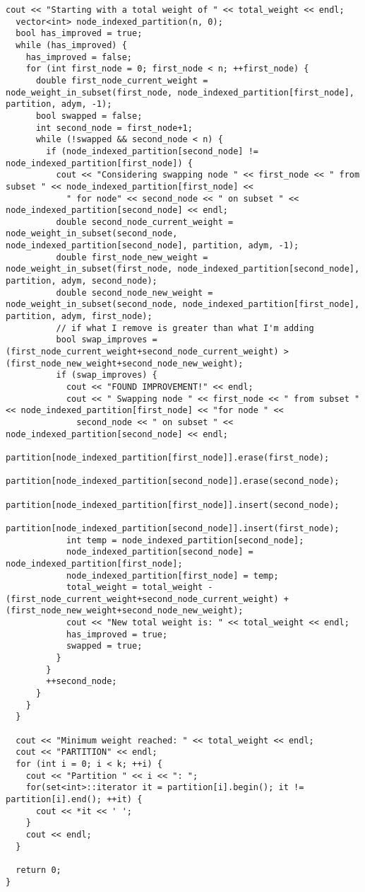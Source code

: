 \begin{lstlisting}[frame=single, breaklines]
  cout << "Starting with a total weight of " << total_weight << endl;
  vector<int> node_indexed_partition(n, 0);
  bool has_improved = true;
  while (has_improved) {
    has_improved = false;
    for (int first_node = 0; first_node < n; ++first_node) {
      double first_node_current_weight = node_weight_in_subset(first_node, node_indexed_partition[first_node], partition, adym, -1);
      bool swapped = false;
      int second_node = first_node+1;
      while (!swapped && second_node < n) {
        if (node_indexed_partition[second_node] != node_indexed_partition[first_node]) {
          cout << "Considering swapping node " << first_node << " from subset " << node_indexed_partition[first_node] << 
            " for node" << second_node << " on subset " << node_indexed_partition[second_node] << endl;
          double second_node_current_weight = node_weight_in_subset(second_node, node_indexed_partition[second_node], partition, adym, -1);
          double first_node_new_weight = node_weight_in_subset(first_node, node_indexed_partition[second_node], partition, adym, second_node);
          double second_node_new_weight = node_weight_in_subset(second_node, node_indexed_partition[first_node], partition, adym, first_node);
          // if what I remove is greater than what I'm adding
          bool swap_improves = (first_node_current_weight+second_node_current_weight) > (first_node_new_weight+second_node_new_weight);
          if (swap_improves) {
            cout << "FOUND IMPROVEMENT!" << endl;
            cout << " Swapping node " << first_node << " from subset " << node_indexed_partition[first_node] << "for node " << 
              second_node << " on subset " << node_indexed_partition[second_node] << endl;
            partition[node_indexed_partition[first_node]].erase(first_node);
            partition[node_indexed_partition[second_node]].erase(second_node);
            partition[node_indexed_partition[first_node]].insert(second_node);
            partition[node_indexed_partition[second_node]].insert(first_node);
            int temp = node_indexed_partition[second_node];
            node_indexed_partition[second_node] = node_indexed_partition[first_node];
            node_indexed_partition[first_node] = temp;
            total_weight = total_weight - (first_node_current_weight+second_node_current_weight) + (first_node_new_weight+second_node_new_weight);
            cout << "New total weight is: " << total_weight << endl;
            has_improved = true;
            swapped = true;
          }
        }
        ++second_node;
      }
    }
  }

  cout << "Minimum weight reached: " << total_weight << endl;
  cout << "PARTITION" << endl;
  for (int i = 0; i < k; ++i) {
    cout << "Partition " << i << ": ";
    for(set<int>::iterator it = partition[i].begin(); it != partition[i].end(); ++it) {
      cout << *it << ' ';
    }
    cout << endl;
  }

  return 0;
}
\end{lstlisting}

